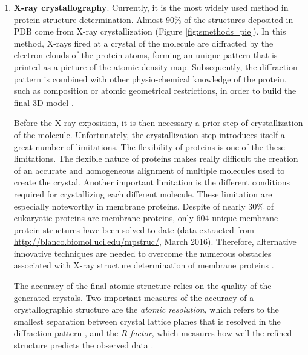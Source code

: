 \documentclass[12pt, b5paper,twoside]{tesi_upf}
\begin{document}
\begin{enumerate}[label=(\alph*)]
\item \textbf{X-ray crystallography}. Currently, it is the most widely used method in protein structure determination. Almost 90$\%$ of the structures deposited in PDB come from X-ray crystallization (Figure \ref{fig:smethods_pie}). In this method, X-rays fired at a crystal of the molecule are diffracted by the electron clouds of the protein atoms, forming an unique pattern that is printed as a picture of the atomic density map. Subsequently, the diffraction pattern is combined with other physio-chemical knowledge of the protein, such as composition or atomic geometrical restrictions, in order to build the final 3D model \cite{Smyth2000}. 
\par Before the X-ray exposition, it is then necessary a prior step of crystallization of the molecule.  Unfortunately, the crystallization step introduces itself a great number of limitations.  The flexibility of proteins is one of the these limitations. The flexible nature of proteins makes really difficult the creation of an accurate and homogeneous alignment of multiple molecules used to create the crystal. Another important limitation is the different conditions required for crystallizing each different molecule. These limitation are especially noteworthy in membrane proteins. Despite of nearly 30$\%$ of eukaryotic proteins are membrane proteins, only 604 unique membrane protein structures have been solved to date (data extracted from \url{http://blanco.biomol.uci.edu/mpstruc/}, March 2016). Therefore, alternative innovative techniques are needed to overcome the numerous obstacles associated with X-ray structure determination of membrane proteins \cite{Bill2011}. 
\par The accuracy of the final atomic structure relies on the quality of the generated crystals. Two important measures of the accuracy of a crystallographic structure are the \textit{atomic resolution}, which refers to the smallest separation between crystal lattice planes that is resolved in the diffraction pattern \cite{Yaffe2005}, and the \textit{R-factor}, which measures how well the refined structure predicts the observed data \cite{Morris1992}. 


\end{enumerate}
\end{document}
